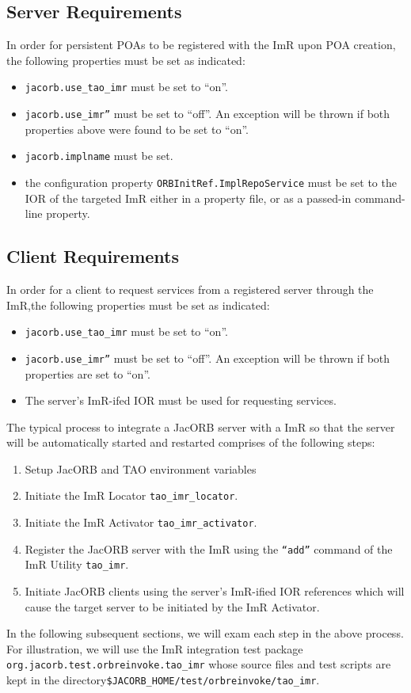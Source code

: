 \subsection{Server Requirements}

In order for persistent POAs to be registered with the ImR upon POA
creation, the following properties must be set as indicated:
\begin{itemize}
    \item {\tt jacorb.use\_tao\_imr} must be set to “on”.
    \item {\tt jacorb.use\_imr”} must be set to “off”.  An exception will be thrown if
              both properties above were found to be set to “on”.
    \item {\tt jacorb.implname} must be set.
    \item the configuration  property {\tt ORBInitRef.ImplRepoService}
              must be set to the IOR of the targeted ImR either in a property file,
              or as a passed-in command-line property.
\end{itemize}

\subsection{Client Requirements}

In order for a client to request services from a registered server through the
ImR,the following properties must be set as indicated:
\begin{itemize}
    \item {\tt jacorb.use\_tao\_imr} must be set to “on”.
    \item {\tt jacorb.use\_imr”} must be set to “off”.  An exception will be thrown if
              both properties are set to “on”.
    \item The server's ImR-ifed IOR must be used for requesting services.
\end{itemize}

The typical process to integrate a JacORB server with a ImR so that the
server will be automatically started and restarted comprises of the following
steps:
\begin{enumerate}
    \item Setup JacORB and TAO environment variables
    \item Initiate the ImR Locator {\tt tao\_imr\_locator}.
    \item Initiate the ImR Activator {\tt tao\_imr\_activator}.
    \item Register the JacORB server with the ImR using the
             {\tt “add”} command of the ImR Utility {\tt tao\_imr}.
    \item Initiate JacORB clients using the server's ImR-ified IOR
              references which will cause the target server to be initiated by
              the ImR Activator.
\end{enumerate}
In the following subsequent sections, we will exam each step in the above
process.  For illustration, we will use the ImR integration test package
{\tt org.jacorb.test.orbreinvoke.tao\_imr} whose source files and test
scripts are kept in the directory{\tt \$JACORB\_HOME/test/orbreinvoke/tao\_imr}.

